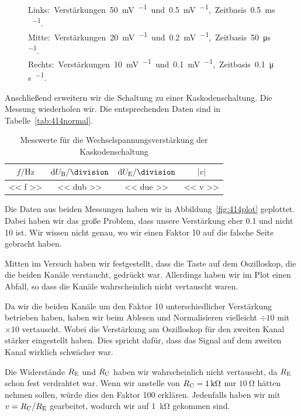 \begin{figure}[htbp]
\begin{minipage}{.3\linewidth}
	\end{minipage}
	\caption{%
		Links:~Verstärkungen~\SI{50}{\milli\volt\per\division}~und~\SI{.5}{\milli\volt\per\division},~Zeitbasis~\SI{.5}{\milli\second\per\division}.
		Mitte:~Verstärkungen~\SI{20}{\milli\volt\per\division}~und~\SI{.2}{\milli\volt\per\division},~Zeitbasis~\SI{50}{\micro\second\per\division}.
		Rechts:~Verstärkungen~\SI{10}{\milli\volt\per\division}~und~\SI{.1}{\milli\volt\per\division},~Zeitbasis~\SI{.1}{\micro\second\per\division}.
	}
	\label{fig:800}
\end{figure}

Anschließend erweitern wir die Schaltung zu einer Kaskodenschaltung. Die
Messung wiederholen wir. Die entsprechenden Daten sind in
Tabelle~\ref{tab:414normal}.

\begin{table}[htbp]
    \centering
    \begin{tabular}{SSS|S}
        {$f / \si\hertz$} &
        {$\dif\UB / \si\division$} &
        {$\dif\UE / \si\division$} &
        {$|v|$} \\
        \hline
        << f >> & << dub >> & << due >> & << v >> \\
    \end{tabular}
    \caption{%
        Messwerte für die Wechselspannungsverstärkung der Kaskodenschaltung
    }
    \label{tab:414Kaskode}
\end{table}

Die Daten aus beiden Messungen haben wir in Abbildung~\ref{fig:414plot}
geplottet. Dabei haben wir das große Problem, dass unsere Verstärkung eher
\num{.1} und nicht 10 ist. Wir wissen nicht genau, wo wir einen Faktor 10 auf
die falsche Seite gebracht haben.

Mitten im Versuch haben wir festgestellt, dass die Taste auf dem Oszilloskop,
die die beiden Kanäle verstaucht, gedrückt war. Allerdings haben wir im Plot
einen Abfall, so dass die Kanäle wahrscheinlich nicht vertauscht waren.

Da wir die beiden Kanäle um den Faktor 10 unterschiedlicher Verstärkung
betrieben haben, haben wir beim Ablesen und Normalisieren vielleicht $\div 10$
mit $\times 10$ vertauscht. Wobei die Verstärkung am Oszilloskop für den
zweiten Kanal stärker eingestellt haben. Dies spricht dafür, dass das Signal
auf dem zweiten Kanal wirklich schwächer war.

Die Widerstände $\RE$ und $\RC$ haben wir wahrscheinlich nicht vertauscht, da
$\RE$ schon fest verdrahtet war. Wenn wir anstelle von $\RC = \SI1{\kilo\ohm}$
nur $\SI{10}\ohm$ hätten nehmen sollen, würde dies den Faktor 100 erklären.
Jedenfalls haben wir mit $v = \RC/\RE$ gearbeitet, wodurch wir auf
\SI{1}{\kilo\ohm} gekommen sind.

